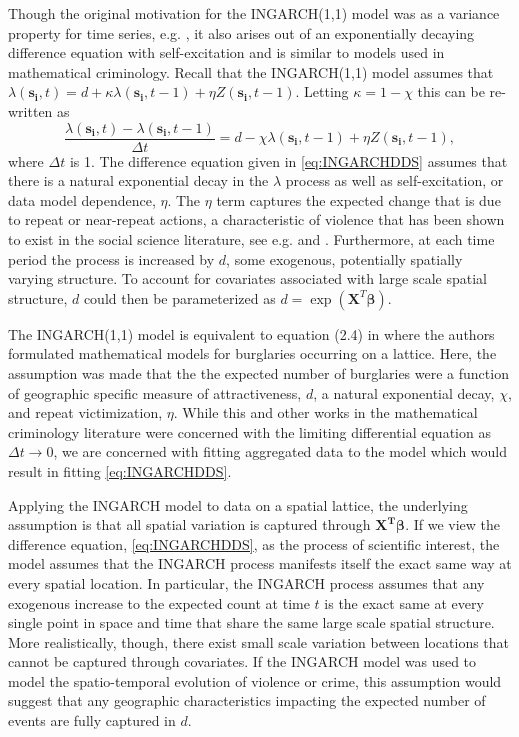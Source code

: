 \documentclass[11pt]{isuthesis}
\begin{document}
Though the original motivation for the INGARCH(1,1) model was as a variance property for time series, e.g. \cite{ferland2006integer}, it also arises out of an exponentially decaying difference equation with self-excitation and is similar to models used in mathematical criminology.  Recall that the INGARCH(1,1) model assumes that $\lambda(\boldsymbol{s_i},t)=d+\kappa \lambda(\boldsymbol{s_i},t-1)+\eta Z(\boldsymbol{s_i},t-1)$.  Letting $\kappa=1-\chi$ this can be re-written as
\begin{equation}
	\frac{\lambda(\boldsymbol{s_i},t)-\lambda(\boldsymbol{s_i},t-1)}{\Delta t}=d-\chi \lambda(\boldsymbol{s_i},t-1)+\eta Z(\boldsymbol{s_i},t-1), \label{eq:INGARCHDDS}
\end{equation}
where $\Delta t$ is 1.  The difference equation given in \eqref{eq:INGARCHDDS} assumes that there is a natural exponential decay in the $\lambda$ process as well as self-excitation, or data model dependence, $\eta$.  The $\eta$ term captures the expected change  that is due to repeat or near-repeat actions, a characteristic of violence that has been shown to exist in the social science literature, see e.g. \cite{polvi1990repeat} and \cite{pease1998repeat}.  Furthermore, at each time period the process is increased by $d$, some exogenous, potentially spatially varying structure.  To account for covariates associated with large scale spatial structure, $d$ could then be parameterized as $d=\exp(\boldsymbol{X}^T \boldsymbol{\beta})$.

The INGARCH(1,1) model is equivalent to equation (2.4) in \cite{short2008statistical} where the authors formulated mathematical models for burglaries occurring on a lattice.  Here, the assumption was made that the the expected number of burglaries were a function of geographic specific measure of attractiveness, $d$, a natural exponential decay, $\chi$, and repeat victimization, $\eta$.  While this and other works in the mathematical criminology literature were concerned with the limiting differential equation as $\Delta t \to 0$, we are concerned with fitting aggregated data to the model which would result in fitting \eqref{eq:INGARCHDDS}.

Applying the INGARCH model to data on a spatial lattice, the underlying assumption is that all spatial variation is captured through $\boldsymbol{X^T}\boldsymbol{\beta}$. If we view the difference equation, \eqref{eq:INGARCHDDS}, as the process of scientific interest, the model assumes that the INGARCH process manifests itself the exact same way at every spatial location.  In particular, the INGARCH process assumes that any exogenous increase to the expected count at time $t$ is the exact same at every single point in space and time that share the same large scale spatial structure.   More realistically, though, there exist small scale variation between locations that cannot be captured through covariates.  If the INGARCH model was used to model the spatio-temporal evolution of violence or crime, this assumption would suggest that any geographic characteristics impacting the expected number of events are fully captured in $d$.
\end{document}
